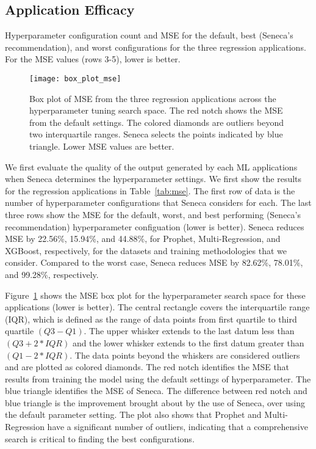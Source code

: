 \subsection{Application Efficacy}

\begin{table}
\centering

\caption{Hyperparameter configuration count and MSE for the default, 
best (Seneca's recommendation), and worst configurations for the three regression applications. 
For the MSE  values (rows 3-5), lower is better.
\label{tab:mse}}
\vspace{-0.2in}
\end{table}

\begin{figure}[t] \centering 
\vspace{-0.5in}
\texttt{[image: box\_plot\_mse]}
\caption{Box plot of MSE from the three regression applications across the 
hyperparameter tuning search space. The red notch shows the MSE from the default settings. 
The colored diamonds are outliers beyond two interquartile ranges. 
Seneca selects the points indicated by blue triangle.
Lower MSE values are better. 
\label{fig:box_plot_mse}}
\vspace{-0.2in}
\end{figure}

We first evaluate the quality of the output generated by each
ML applications when Seneca determines the hyperparameter settings. We
first show the results for the regression applications in
Table~\ref{tab:mse}.
The first row of data is the number of hyperparameter 
configurations that Seneca considers for each.
The last three rows show the MSE for the default, worst, and best performing (Seneca's recommendation)
hyperparameter configuation (lower is better).
Seneca reduces MSE by 22.56\%, 15.94\%, and 44.88\%, for Prophet, Multi-Regression, and XGBoost,
respectively, for the datasets and training methodologies that we consider.
Compared to the worst case, Seneca reduces MSE by 82.62\%, 78.01\%, and 99.28\%, respectively.

Figure~\ref{fig:box_plot_mse} shows the MSE box plot for the hyperparameter search space for these applications (lower is better). 
The central rectangle covers the interquartile range (IQR),
which is defined as the range of data
points from first quartile to third quartile \texttt{$(Q3 - Q1)$}.
The upper whisker extends to the last datum less
than \texttt{$(Q3 + 2 * IQR)$} and the lower whisker extends to the first datum greater
than \texttt{$(Q1 - 2 * IQR)$}. The data points beyond the whiskers are considered outliers
and are plotted as colored diamonds. The red notch identifies the MSE that results from training
the model using the default settings of hyperparameter.
The blue triangle identifies the MSE of Seneca.
The difference between red notch and blue triangle
is the improvement brought about by the use of Seneca, over 
using the default parameter setting.
The plot also shows
that Prophet and Multi-Regression have a significant number of outliers,
indicating that a comprehensive search is critical to finding the best configurations.

